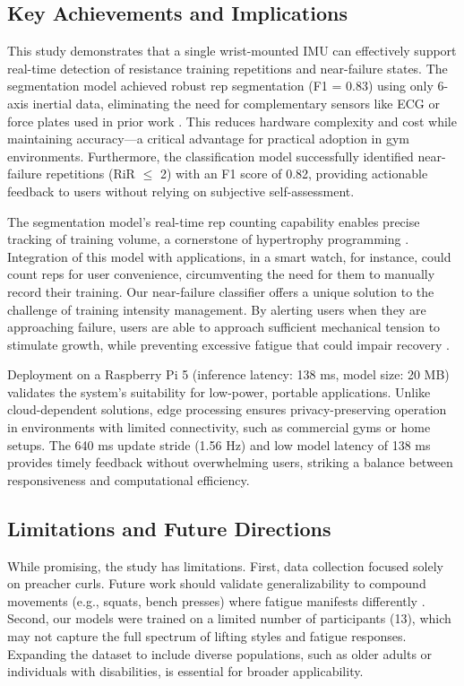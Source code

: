 \documentclass[conference]{IEEEtran}
\begin{document}
\subsection{Key Achievements and Implications}
This study demonstrates that a single wrist-mounted IMU can effectively support real-time detection of resistance training repetitions and near-failure states. The segmentation model achieved robust rep segmentation (F1 = 0.83) using only 6-axis inertial data, eliminating the need for complementary sensors like ECG or force plates used in prior work \cite{albert2021using, jiang2021data}. This reduces hardware complexity and cost while maintaining accuracy---a critical advantage for practical adoption in gym environments. Furthermore, the classification model successfully identified near-failure repetitions (RiR $\le$ 2) with an F1 score of 0.82, providing actionable feedback to users without relying on subjective self-assessment.

The segmentation model's real-time rep counting capability enables precise tracking of training volume, a cornerstone of hypertrophy programming \cite{refalo2024similar}. Integration of this model with applications, in a smart watch, for instance, could count reps for user convenience, circumventing the need for them to manually record their training. Our near-failure classifier offers a unique solution to the challenge of training intensity management. By alerting users when they are approaching failure, users are able to approach sufficient mechanical tension to stimulate growth, while preventing excessive fatigue that could impair recovery \cite{izquierdo2006differential}. 

Deployment on a Raspberry Pi 5 (inference latency: 138 ms, model size: 20 MB) validates the system's suitability for low-power, portable applications. Unlike cloud-dependent solutions, edge processing ensures privacy-preserving operation in environments with limited connectivity, such as commercial gyms or home setups. The 640 ms update stride (1.56 Hz) and low model latency of 138 ms provides timely feedback without overwhelming users, striking a balance between responsiveness and computational efficiency. 

\subsection{Limitations and Future Directions}
While promising, the study has limitations. First, data collection focused solely on preacher curls. Future work should validate generalizability to compound movements (e.g., squats, bench presses) where fatigue manifests differently \cite{velloso2013qualitative}. Second, our models were trained on a limited number of participants (13), which may not capture the full spectrum of lifting styles and fatigue responses. Expanding the dataset to include diverse populations, such as older adults or individuals with disabilities, is essential for broader applicability. 
\end{document}
